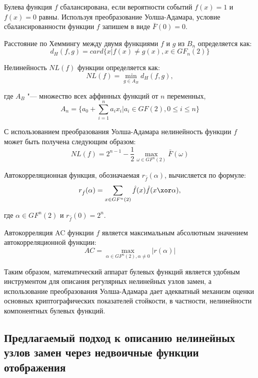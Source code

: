 Булева функция $f$ сбалансирована, если вероятности событий $f(x) = 1$ и $f(x) =
0$ равны. Используя преобразование Уолша-Адамара, условие сбалансированности
функции $f$ запишем в виде $\bar{F}(0) = 0$.

Расстояние по Хеммингу между двумя функциями $f$ и $g$ из $B_n$ определяется
как:
\begin{equation}d_H(f, g) = card\{x | f(x) \neq g(x), x \in
GF_n(2)\}\end{equation}

Нелинейность $NL(f)$ функции определяется как:
\begin{equation}NL(f) = \min_{g \in A_B}{d_H(f, g)},\end{equation}

где $A_B$ "--- множество всех аффинных функций от $n$ переменных,
\begin{equation}A_n = \{a_0 + \sum^{n}_{i=1}{a_i x_i} | a_i \in GF(2), 0 \leq i
\leq n\}\end{equation}

С использованием преобразования Уолша-Адамара нелинейность функции $f$ может
быть получена следующим образом:
\begin{equation}NL(f) = 2^{n-1} - \frac{1}{2} \max_{\omega \in
GF^n(2)}{\bar{F}(\omega)}\end{equation}

Автокорреляционная функция, обозначаемая $r_{\hat{f}}(\alpha)$, вычисляется по
формуле:
\begin{equation}r_{\hat{f}}(\alpha) = \sum_{x \in GF^n(2)}{\hat{f}(x)\hat{f}(x
\xor \alpha)},\end{equation}

где $\alpha \in GF^n(2)$ и $r_{\hat{f}}(0) = 2^n$.

Автокорреляция AC функции $f$ является максимальным абсолютным значением
автокорреляционной функции:
\begin{equation}AC = \max_{\alpha \in GF^n(2), \alpha \neq 0}{|r(\alpha)|}\end{equation}

Таким образом, математический аппарат булевых функций является удобным
инструментом для описания регулярных нелинейных узлов замен, а использование
преобразования Уолша-Адамара дает адекватный механизм оценки основных
криптографических показателей стойкости, в частности, нелинейности компонентных
булевых функций.

\subsection{Предлагаемый подход к описанию нелинейных узлов замен через недвоичные функции
отображения}

